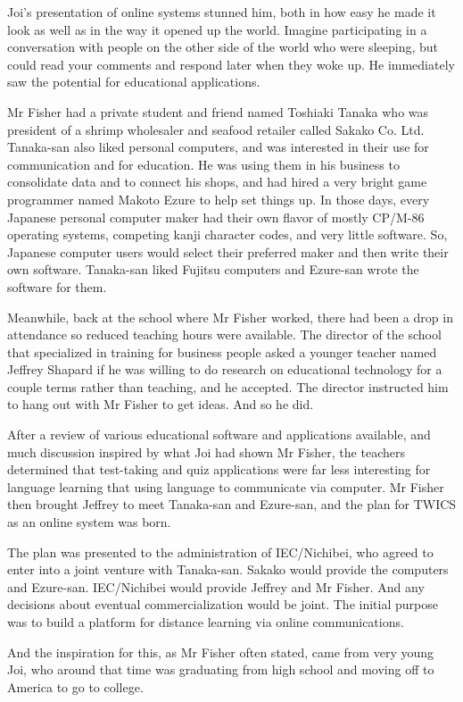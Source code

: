 Joi's presentation of online systems stunned him, both in how easy he made it look as well as in the way it opened up the world. Imagine participating in a conversation with people on the other side of the world who were sleeping, but could read your comments and respond later when they woke up. He immediately saw the potential for educational applications.

Mr Fisher had a private student and friend named Toshiaki Tanaka who was president of a shrimp wholesaler and seafood retailer called Sakako Co. Ltd. Tanaka-san also liked personal computers, and was interested in their use for communication and for education. He was using them in his business to consolidate data and to connect his shops, and had hired a very bright game programmer named Makoto Ezure to help set things up. In those days, every Japanese personal computer maker had their own flavor of mostly CP/M-86 operating systems, competing kanji character codes, and very little software. So, Japanese computer users would select their preferred maker and then write their own software. Tanaka-san liked Fujitsu computers and Ezure-san wrote the software for them.

Meanwhile, back at the school where Mr Fisher worked, there had been a drop in attendance so reduced teaching hours were available. The director of the school that specialized in training for business people asked a younger teacher named Jeffrey Shapard if he was willing to do research on educational technology for a couple terms rather than teaching, and he accepted. The director instructed him to hang out with Mr Fisher to get ideas. And so he did.

After a review of various educational software and applications available, and much discussion inspired by what Joi had shown Mr Fisher, the teachers determined that test-taking and quiz applications were far less interesting for language learning that using language to communicate via computer. Mr Fisher then brought Jeffrey to meet Tanaka-san and Ezure-san, and the plan for TWICS as an online system was born.

The plan was presented to the administration of IEC/Nichibei, who agreed to enter into a joint venture with Tanaka-san. Sakako would provide the computers and Ezure-san. IEC/Nichibei would provide Jeffrey and Mr Fisher. And any decisions about eventual commercialization would be joint. The initial purpose was to build a platform for distance learning via online communications.

And the inspiration for this, as Mr Fisher often stated, came from very young Joi, who around that time was graduating from high school and moving off to America to go to college.

